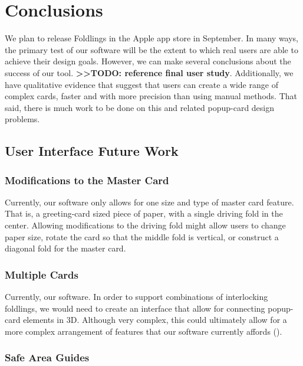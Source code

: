 \chapter{Conclusions}

We plan to release Foldlings in the Apple app store in September. In
many ways, the primary test of our software will be the extent to which
real users are able to achieve their design goals. However, we can make
several conclusions about the success of our tool.
\textbf{\textgreater{}\textgreater{}TODO: reference final user study}.
Additionally, we have qualitative evidence that suggest that users can
create a wide range of complex cards, faster and with more precision
than using manual methods. That said, there is much work to be done on
this and related popup-card design problems.

\section{User Interface Future Work}\label{user-interface-future-work}

\subsection{Modifications to the Master
Card}\label{modifications-to-the-master-card}

Currently, our software only allows for one size and type of master card
feature. That is, a greeting-card sized piece of paper, with a single
driving fold in the center. Allowing modifications to the driving fold
might allow users to change paper size, rotate the card so that the
middle fold is vertical, or construct a diagonal fold for the master
card.

\subsection{Multiple Cards}\label{multiple-cards}

Currently, our software. In order to support combinations of
interlocking foldlings, we would need to create an interface that allow
for connecting popup-card elements in 3D. Although very complex, this
could ultimately allow for a more complex arrangement of features that
our software currently affords (\citet{hart2007modular}).

\subsection{Safe Area Guides}\label{safe-area-guides}

